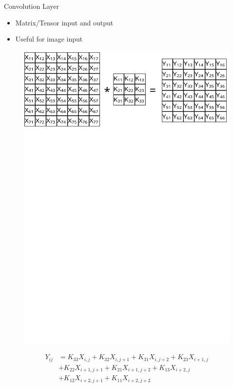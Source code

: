 \documentclass{beamer}
\begin{document}
\begin{frame}{Convolution Layer}
    \begin{itemize}
        \item Matrix/Tensor input and output
        \item Useful for image input
    \end{itemize}

    \begin{figure}
        \includegraphics[width=\textwidth]{conv}
    \end{figure}

    \vspace{-10pt}
    \begin{align*}
        Y_{ij} &= K_{33}X_{i,j} + K_{32}X_{i,j+1} + K_{31}X_{i,j+2} + K_{23}X_{i+1,j} \\
               &  + K_{22}X_{i+1,j+1} + K_{21}X_{i+1,j+2} + K_{13}X_{i+2,j} \\
               & + K_{12}X_{i+2,j+1} + K_{11}X_{i+2,j+2}
    \end{align*}
\end{frame}
\end{document}
